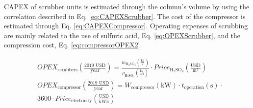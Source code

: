\begin{refsection}[referencesCh6]
%

CAPEX of scrubber units is estimated through the column's volume by using the correlation described in Eq. \ref{eq:CAPEXScrubber}. The cost of the compressor is estimated through Eq. \ref{eq:CAPEXCompressor}.
Operating expenses of scrubbing are mainly related to the use of sulfuric acid, Eq. \ref{eq:OPEXScrubber}, and the compression cost, Eq. \ref{eq:compressorOPEX2}.

\begin{align}
& OPEX_{\text{scrubbers}} \left(\frac{\text{2019 USD}}{\text{year}}\right) = \frac{\dot{m}_{\text{H}_2 \text{SO}_4} \left(\frac{\text{kg}}{\text{s}}\right)}{\rho_{\text{H}_2 \text{SO}_4} \left(\frac{\text{kg}}{\text{m}^3}\right)} \cdot Price_{\text{H}_2 \text{SO}_4} \left(\frac{\text{USD}}{\text{m}^3}\right)  \label{eq:OPEXScrubber}
\\
& OPEX_{\text{compressor}} \left(\frac{\text{2019 USD}}{\text{year}}\right) = \dot{W}_{\text{compressor}} \left(\text{kW}\right) \cdot t_{\text{operation}} \left(\text{s}\right) \cdot \nonumber \\
& 3600 \cdot Price_{\text{electricity}}\left(\frac{\text{USD}}{\text{kWh}}\right) \label{eq:compressorOPEX2}
\end{align}	


\end{refsection}
